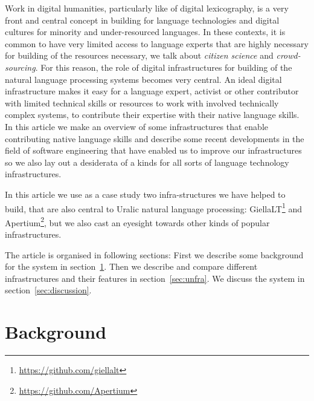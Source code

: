 \documentclass[free]{flammie}
\begin{document}
Work in digital humanities, particularly like of digital lexicography, is a very front and central concept in building for language technologies and digital cultures for minority and under-resourced languages.
In these contexts, it is common to have very limited access to language experts that are highly necessary for building of the resources necessary, we talk about \textit{citizen science} and \textit{crowd-sourcing}.
For this reason, the role of digital infrastructures for building of the natural language processing systems becomes very central.
An ideal digital infrastructure makes it easy for a language expert, activist or other contributor with limited technical skills or resources to work with involved technically complex systems, to contribute their expertise with their native language skills.
In this article we make an overview of some infrastructures that enable contributing native language skills and describe some recent developments in the field of software engineering that have enabled us to improve our infrastructures so we also lay out a desiderata of a kinds for all sorts of language technology infrastructures.

In this article we use as a case study two infra-structures we have helped to build, that are also central to Uralic natural language processing: GiellaLT\footnote{\url{https://github.com/giellalt}} and Apertium\footnote{\url{https://github.com/Apertium}}, but we also cast an eyesight towards other kinds of popular infrastructures.

The article is organised in following sections: First we describe some background for the system in section~\ref{sec:background}.
Then we describe and compare different infrastructures and their features in section~\ref{sec:unfra}.
We discuss the system in section~\ref{sec:discussion}.

\section{Background} \label{sec:background}
\end{document}
